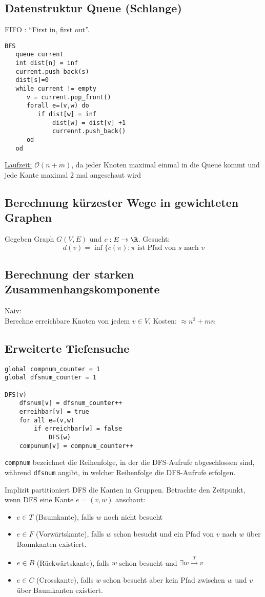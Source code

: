 \documentclass[11pt]{scrartcl}
\begin{document}
\subsection{Datenstruktur Queue (Schlange)}
FIFO : “First in, first out”.

\begin{verbatim}
BFS
   queue current
   int dist[n] = inf
   current.push_back(s)
   dist[s]=0
   while current != empty
      v = current.pop_front()
      forall e=(v,w) do
         if dist[w] = inf
             dist[w] = dist[v] +1
             currennt.push_back()
      od
   od
\end{verbatim}

\underline{Laufzeit:}
$\mathcal O(n+m)$, da jeder Knoten maximal einmal in die Queue kommt und jede Kante maximal 2 mal angeschaut wird

\subsection{Berechnung kürzester Wege in gewichteten Graphen}
Gegeben Graph $G(V,E)$ und $c:E\to \R$.
Gesucht:\\
\[
d(v)=\inf\{c(\pi):\pi \text{ ist Pfad von $s$ nach $v$}
\]

\subsection{Berechnung der starken Zusammenhangskomponente}
Naiv:\\
Berechne erreichbare Knoten von jedem $v\in V$, Kosten: $\approx n^2+mn$

\subsection{Erweiterte Tiefensuche}

\begin{verbatim}
global compnum_counter = 1
global dfsnum_counter = 1

DFS(v)
    dfsnum[v] = dfsnum_counter++
    erreihbar[v] = true
    for all e=(v,w)
        if erreichbar[w] = false
            DFS(w)
    compunum[v] = compnum_counter++
\end{verbatim}

\verb|compnum| bezeichnet die Reihenfolge, in der die DFS-Aufrufe abgeschlossen sind, während \verb|dfsnum| angibt, in welcher Reihenfolge die DFS-Aufrufe erfolgen.

Implizit partitioniert DFS die Kanten in Gruppen.
Betrachte den Zeitpunkt, wenn DFS eine Kante $e=(v,w)$ anschaut:
\begin{itemize}
\item $e\in T$ (Baumkante), falls $w$ noch nicht besucht
\item $e\in F$ (Vorwärtskante), falls $w$ schon besucht und ein Pfad von $v$ nach $w$ über Baumkanten existiert.
\item $e\in B$ (Rückwärtskante), falls $w$ schon besucht und $\exists w\stackrel{T}\to v$
\item $e\in C$ (Crosskante), falls $w$ schon besucht aber kein Pfad zwischen $w$ und $v$ über Baumkanten existiert.
\end{itemize}
\end{document}

